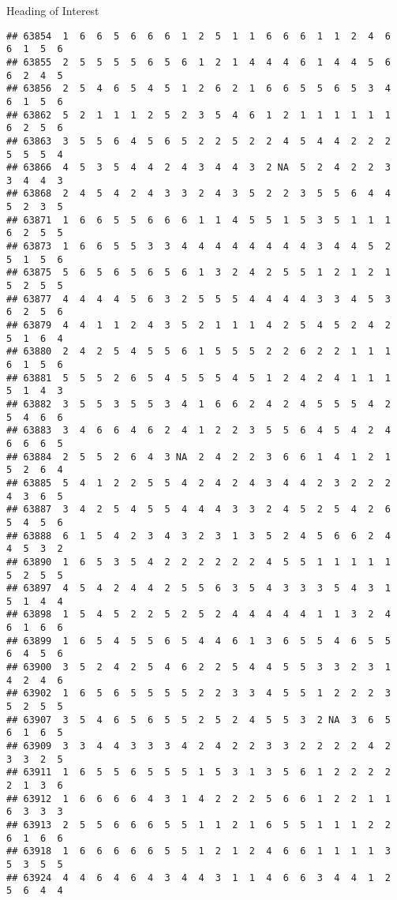 \documentclass[
  ignorenonframetext,
]{beamer}
\begin{document}
\begin{frame}[fragile]{Heading of Interest}
\begin{verbatim}
## 63854  1  6  6  5  6  6  6  1  2  5  1  1  6  6  6  1  1  2  4  6  6  1  5  6
## 63855  2  5  5  5  5  6  5  6  1  2  1  4  4  4  6  1  4  4  5  6  6  2  4  5
## 63856  2  5  4  6  5  4  5  1  2  6  2  1  6  6  5  5  6  5  3  4  6  1  5  6
## 63862  5  2  1  1  1  2  5  2  3  5  4  6  1  2  1  1  1  1  1  1  6  2  5  6
## 63863  3  5  5  6  4  5  6  5  2  2  5  2  2  4  5  4  4  2  2  2  5  5  5  4
## 63866  4  5  3  5  4  4  2  4  3  4  4  3  2 NA  5  2  4  2  2  3  3  4  4  3
## 63868  2  4  5  4  2  4  3  3  2  4  3  5  2  2  3  5  5  6  4  4  5  2  3  5
## 63871  1  6  6  5  5  6  6  6  1  1  4  5  5  1  5  3  5  1  1  1  6  2  5  5
## 63873  1  6  6  5  5  3  3  4  4  4  4  4  4  4  4  3  4  4  5  2  5  1  5  6
## 63875  5  6  5  6  5  6  5  6  1  3  2  4  2  5  5  1  2  1  2  1  5  2  5  5
## 63877  4  4  4  4  5  6  3  2  5  5  5  4  4  4  4  3  3  4  5  3  6  2  5  6
## 63879  4  4  1  1  2  4  3  5  2  1  1  1  4  2  5  4  5  2  4  2  5  1  6  4
## 63880  2  4  2  5  4  5  5  6  1  5  5  5  2  2  6  2  2  1  1  1  6  1  5  6
## 63881  5  5  5  2  6  5  4  5  5  5  4  5  1  2  4  2  4  1  1  1  5  1  4  3
## 63882  3  5  5  3  5  5  3  4  1  6  6  2  4  2  4  5  5  5  4  2  5  4  6  6
## 63883  3  4  6  6  4  6  2  4  1  2  2  3  5  5  6  4  5  4  2  4  6  6  6  5
## 63884  2  5  5  2  6  4  3 NA  2  4  2  2  3  6  6  1  4  1  2  1  5  2  6  4
## 63885  5  4  1  2  2  5  5  4  2  4  2  4  3  4  4  2  3  2  2  2  4  3  6  5
## 63887  3  4  2  5  4  5  5  4  4  4  3  3  2  4  5  2  5  4  2  6  5  4  5  6
## 63888  6  1  5  4  2  3  4  3  2  3  1  3  5  2  4  5  6  6  2  4  4  5  3  2
## 63890  1  6  5  3  5  4  2  2  2  2  2  2  4  5  5  1  1  1  1  1  5  2  5  5
## 63897  4  5  4  2  4  4  2  5  5  6  3  5  4  3  3  3  5  4  3  1  5  1  4  4
## 63898  1  5  4  5  2  2  5  2  5  2  4  4  4  4  4  1  1  3  2  4  6  1  6  6
## 63899  1  6  5  4  5  5  6  5  4  4  6  1  3  6  5  5  4  6  5  5  6  4  5  6
## 63900  3  5  2  4  2  5  4  6  2  2  5  4  4  5  5  3  3  2  3  1  4  2  4  6
## 63902  1  6  5  6  5  5  5  5  2  2  3  3  4  5  5  1  2  2  2  3  5  2  5  5
## 63907  3  5  4  6  5  6  5  5  2  5  2  4  5  5  3  2 NA  3  6  5  6  1  6  5
## 63909  3  3  4  4  3  3  3  4  2  4  2  2  3  3  2  2  2  2  4  2  3  3  2  5
## 63911  1  6  5  5  6  5  5  5  1  5  3  1  3  5  6  1  2  2  2  2  2  1  3  6
## 63912  1  6  6  6  6  4  3  1  4  2  2  2  5  6  6  1  2  2  1  1  6  3  3  3
## 63913  2  5  5  6  6  6  5  5  1  1  2  1  6  5  5  1  1  1  2  2  6  1  6  6
## 63918  1  6  6  6  6  6  5  5  1  2  1  2  4  6  6  1  1  1  1  3  5  3  5  5
## 63924  4  4  6  4  6  4  3  4  4  3  1  1  4  6  6  3  4  4  1  2  5  6  4  4

\end{verbatim}
\end{frame}
\end{document}
